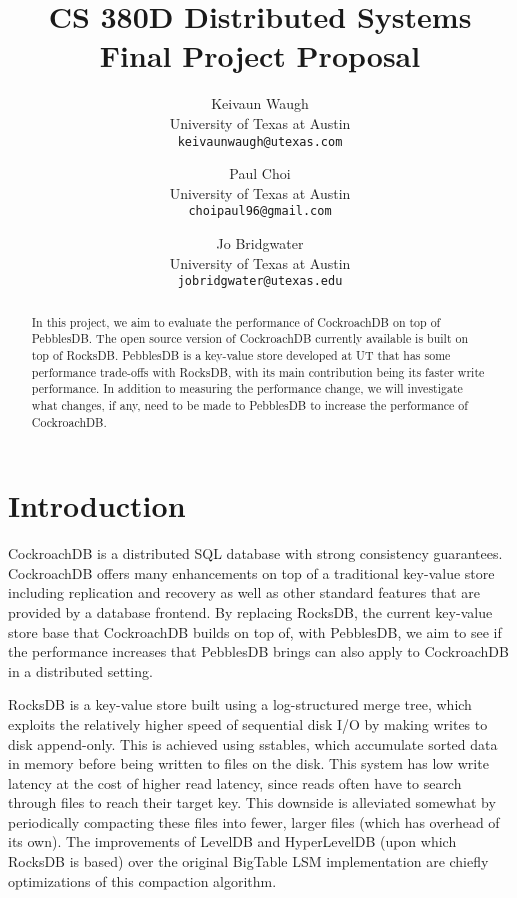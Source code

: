\documentclass[10pt,twocolumn,letterpaper]{article}
\begin{document}
\title{CS 380D Distributed Systems Final Project Proposal}

\author{Keivaun Waugh\\
University of Texas at Austin\\
{\tt\small keivaunwaugh@utexas.com}
\and
Paul Choi\\
University of Texas at Austin\\
{\tt\small choipaul96@gmail.com}
\and
Jo Bridgwater\\
University of Texas at Austin\\
{\tt\small jobridgwater@utexas.edu}
}

\maketitle

\begin{abstract}
    In this project, we aim to evaluate the performance of CockroachDB on top of
    PebblesDB. The open source version of CockroachDB currently available is
    built on top of RocksDB. PebblesDB is a key-value store developed at UT
    that has some performance trade-offs with RocksDB, with its main
    contribution being its faster write performance. In addition to measuring
    the performance change, we will investigate what changes, if any, need to
    be made to PebblesDB to increase the performance of CockroachDB.
\end{abstract}

\section{Introduction}
CockroachDB is a distributed SQL database with strong consistency guarantees.
CockroachDB offers many enhancements on top of a traditional key-value store
including replication and recovery as well as other standard features that are
provided by a database frontend. By replacing RocksDB, the current key-value
store base that CockroachDB builds on top of, with PebblesDB, we aim to see if
the performance increases that PebblesDB brings can also apply to CockroachDB
in a distributed setting.

RocksDB is a key-value store built using a log-structured merge tree, which
exploits the relatively higher speed of sequential disk I/O by making writes to
disk append-only. This is achieved using sstables, which accumulate sorted data
in memory before being written to files on the disk. This system has low write
latency at the cost of higher read latency, since reads often have to search
through files to reach their target key. This downside is alleviated somewhat
by periodically compacting these files into fewer, larger files (which has
overhead of its own). The improvements of LevelDB and HyperLevelDB (upon which
RocksDB is based) over the original BigTable LSM implementation are chiefly
optimizations of this compaction algorithm.
\end{document}
